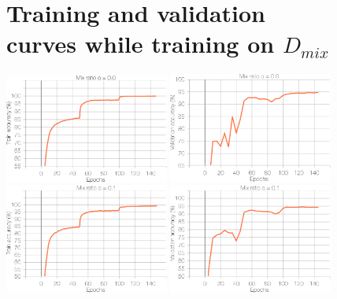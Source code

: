 \newpage

\begin{figure}[htb]
\section{Training and validation curves while training on $D_{mix}$}
    \vspace{10pt}
    \centering
    \includegraphics[width=0.48\textwidth]{figs/acc_loss_mix/mix0.0/nat_train_top1.eps}
    \hspace{10pt}
    \includegraphics[width=0.48\textwidth]{figs/acc_loss_mix/mix0.0/nat_val_top1.eps}\\
    \vspace{10pt}
    \includegraphics[width=0.48\textwidth]{figs/acc_loss_mix/mix0.1/nat_train_top1.eps}
    \hspace{10pt}
    \includegraphics[width=0.48\textwidth]{figs/acc_loss_mix/mix0.1/nat_val_top1.eps}\\

\end{figure}
